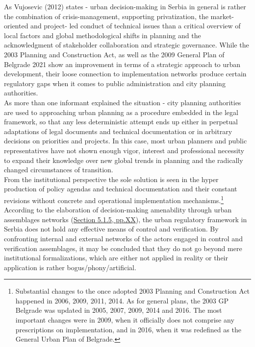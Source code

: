 \documentclass[11pt]{report}
\begin{document}
As Vujosevic (2012) states - urban decision-making in Serbia in general is rather the combination of crisis-management, supporting privatization, the market-oriented and project- led conduct of technical issues than a critical overview of local factors and global methodological shifts in planning and the acknowledgment of stakeholder collaboration and strategic governance. While the 2003 Planning and Construction Act, as well as the 2009 General Plan of Belgrade 2021 show an improvement in terms of a strategic approach to urban development, their loose connection to implementation networks produce certain regulatory gaps when it comes to public administration and city planning authorities.
\\

As more than one informant explained the situation - city planning authorities are used to approaching urban planning as a procedure embedded in the legal framework, so that any less deterministic attempt ends up either in perpetual adaptations of legal documents and technical documentation or in arbitrary decisions on priorities and projects. In this case, most urban planners and public representatives have not shown enough vigor, interest and professional necessity to expand their knowledge over new global trends in planning and the radically changed circumstances of transition.
\\

From the institutional perspective the sole solution is seen in the hyper production of policy agendas and technical documentation and their constant revisions without concrete and operational implementation mechanisms.\footnote{
Substantial changes to the once adopted 2003 Planning and Construction Act happened in 2006, 2009, 2011, 2014. As for general plans, the 2003 GP Belgrade was updated in 2005, 2007, 2009, 2014 and 2016. The most important changes were in 2009, when it officially does not comprise any prescriptions on implementation, and in 2016, when it was redefined as the General Urban Plan of Belgrade.}
According to the elaboration of decision-making amenability through urban assemblages networks (\href{ref}{Section 5.1.5, pp.XX}), the urban regulatory framework in Serbia does not hold any effective means of control and verification.
By confronting internal and external networks of the actors engaged in control and verification assemblages, it may be concluded that they do not go beyond mere institutional formalizations, which are either not applied in reality or their application is rather bogus/phony/artificial.
\\
\end{document}
